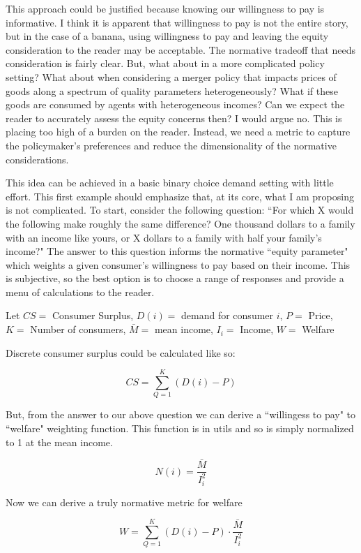 \documentclass[11pt]{article}
\begin{document}
This approach could be justified because knowing our willingness to pay is informative. I think it is apparent that willingness to pay is not the entire story, but in the case of a banana, using willingness to pay and leaving the equity consideration to the reader may be acceptable. The normative tradeoff that needs consideration is fairly clear. But, what about in a more complicated policy setting? What about when considering a merger policy that impacts prices of goods along a spectrum of quality parameters heterogeneously? What if these goods are consumed by agents with heterogeneous incomes? Can we expect the reader to accurately assess the equity concerns then? I would argue no. This is placing too high of a burden on the reader. Instead, we need a metric to capture the policymaker's preferences and reduce the dimensionality of the normative considerations. 



This idea can be achieved in a basic binary choice demand setting with little effort. This first example should emphasize that, at its core, what I am proposing is not complicated. To start, consider the following question:  ``For which X would the following make roughly the same difference? One thousand dollars to a family with an income like yours, or X dollars to a family with half your family's income?" The answer to this question informs the normative ``equity parameter" which weights a given consumer's willingness to pay based on their income. This is subjective, so the best option is to choose a range of responses and provide a menu of calculations to the reader. 

Let $CS =$ Consumer Surplus, $D(i)=$ demand for consumer $i$, $P =$ Price, $K =$ Number of consumers, 
$\bar{M} =$ mean income, $I_i =$ Income, $W = $ Welfare   

Discrete consumer surplus could be calculated like so: 

$$  CS = \sum_{Q = 1}^{K} (D(i) - P) $$

But, from the answer to our above question we can derive a ``willingess to pay" to ``welfare" weighting function. This function is in utils and so is simply normalized to 1 at the mean income. 

$$ N(i) = \frac{\bar{M}}{I_i^2} $$

Now we can derive a truly normative metric for welfare

$$  W = \sum_{Q = 1}^{K} (D(i) - P) \cdot \frac{\bar{M}}{I_i^2}  $$
\end{document}
